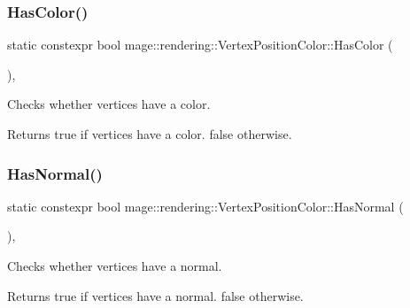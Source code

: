 \subsubsection{\texorpdfstring{Has\+Color()}{HasColor()}}
{\footnotesize\ttfamily static constexpr bool mage\+::rendering\+::\+Vertex\+Position\+Color\+::\+Has\+Color (\begin{DoxyParamCaption}{ }\end{DoxyParamCaption})\hspace{0.3cm}{\ttfamily [static]}, {\ttfamily [noexcept]}}

Checks whether vertices have a color.

\begin{DoxyReturn}{Returns}
{\ttfamily true} if vertices have a color. {\ttfamily false} otherwise. 
\end{DoxyReturn}
\hypertarget{structmage_1_1rendering_1_1_vertex_position_color_a95f2749a6f879b4123034a78c504f3c5}{}\label{structmage_1_1rendering_1_1_vertex_position_color_a95f2749a6f879b4123034a78c504f3c5} 
\subsubsection{\texorpdfstring{Has\+Normal()}{HasNormal()}}
{\footnotesize\ttfamily static constexpr bool mage\+::rendering\+::\+Vertex\+Position\+Color\+::\+Has\+Normal (\begin{DoxyParamCaption}{ }\end{DoxyParamCaption})\hspace{0.3cm}{\ttfamily [static]}, {\ttfamily [noexcept]}}

Checks whether vertices have a normal.

\begin{DoxyReturn}{Returns}
{\ttfamily true} if vertices have a normal. {\ttfamily false} otherwise. 
\end{DoxyReturn}
\hypertarget{structmage_1_1rendering_1_1_vertex_position_color_a9a905a75c75030b37575a7b65dff61b0}{}\label{structmage_1_1rendering_1_1_vertex_position_color_a9a905a75c75030b37575a7b65dff61b0} 
